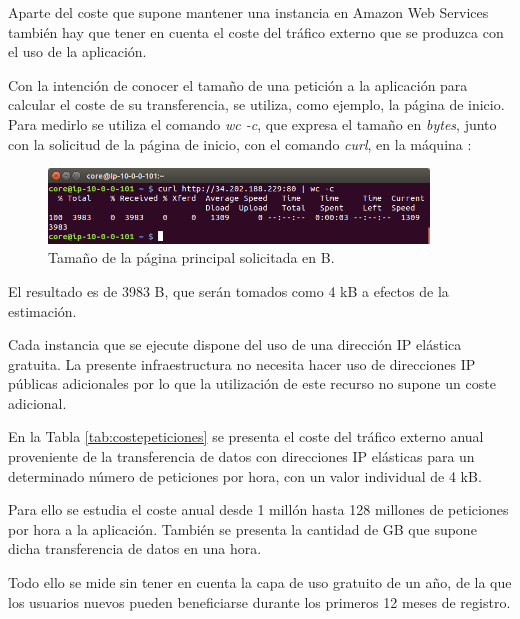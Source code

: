 Aparte del coste que supone mantener una instancia en Amazon Web Services también hay que tener en cuenta el coste del tráfico externo que se produzca con el uso de la aplicación.

Con la intención de conocer el tamaño de una petición a la aplicación para calcular el coste de su transferencia, se utiliza, como ejemplo, la página de inicio. Para medirlo se utiliza el comando \textit{wc -c}, que expresa el tamaño en \textit{bytes}, junto con la solicitud de la página de inicio, con el comando \textit{curl}, en la máquina :

\begin{figure}[H]
\centering
\includegraphics[width=0.9\textwidth]{images/figures/curl-wc.png}
\caption{Tamaño de la página principal solicitada en B.}
\end{figure}

El resultado es de 3983 B, que serán tomados como 4 kB a efectos de la estimación.

Cada instancia que se ejecute dispone del uso de una dirección IP elástica gratuita. La presente infraestructura no necesita hacer uso de direcciones IP públicas adicionales por lo que la utilización de este recurso no supone un coste adicional.

En la Tabla \ref{tab:costepeticiones} se presenta el coste del tráfico externo anual proveniente de la transferencia de datos con direcciones IP elásticas para un determinado número de peticiones por hora, con un valor individual de 4 kB.

Para ello se estudia el coste anual desde 1 millón hasta 128 millones de peticiones por hora a la aplicación. También se presenta la cantidad de GB que supone dicha transferencia de datos en una hora.

Todo ello se mide sin tener en cuenta la capa de uso gratuito de un año, de la que los usuarios nuevos pueden beneficiarse durante los primeros 12 meses de registro.

\FloatBarrier

